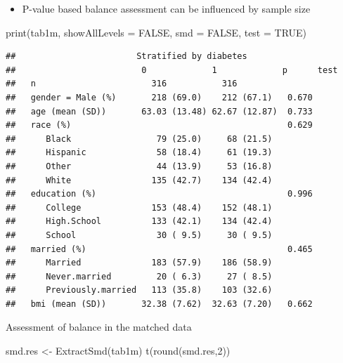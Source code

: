 \documentclass[
]{book}
\newenvironment{Shaded}{\begin{snugshade}}{\end{snugshade}}
\newcommand{\AttributeTok}[1]{\textcolor[rgb]{0.77,0.63,0.00}{#1}}
\newcommand{\ConstantTok}[1]{\textcolor[rgb]{0.00,0.00,0.00}{#1}}
\newcommand{\DecValTok}[1]{\textcolor[rgb]{0.00,0.00,0.81}{#1}}
\newcommand{\FunctionTok}[1]{\textcolor[rgb]{0.00,0.00,0.00}{#1}}
\newcommand{\NormalTok}[1]{#1}
\newcommand{\OtherTok}[1]{\textcolor[rgb]{0.56,0.35,0.01}{#1}}
\providecommand{\tightlist}{%
  \setlength{\itemsep}{0pt}\setlength{\parskip}{0pt}}
\begin{document}
\begin{itemize}
\tightlist
\item
  P-value based balance assessment can be influenced by sample size
\end{itemize}

\begin{Shaded}
\begin{Highlighting}[]
\FunctionTok{print}\NormalTok{(tab1m, }\AttributeTok{showAllLevels =} \ConstantTok{FALSE}\NormalTok{, }\AttributeTok{smd =} \ConstantTok{FALSE}\NormalTok{, }\AttributeTok{test =} \ConstantTok{TRUE}\NormalTok{) }
\end{Highlighting}
\end{Shaded}

\begin{verbatim}
##                        Stratified by diabetes
##                         0             1             p      test
##   n                       316           316                    
##   gender = Male (%)       218 (69.0)    212 (67.1)   0.670     
##   age (mean (SD))       63.03 (13.48) 62.67 (12.87)  0.733     
##   race (%)                                           0.629     
##      Black                 79 (25.0)     68 (21.5)             
##      Hispanic              58 (18.4)     61 (19.3)             
##      Other                 44 (13.9)     53 (16.8)             
##      White                135 (42.7)    134 (42.4)             
##   education (%)                                      0.996     
##      College              153 (48.4)    152 (48.1)             
##      High.School          133 (42.1)    134 (42.4)             
##      School                30 ( 9.5)     30 ( 9.5)             
##   married (%)                                        0.465     
##      Married              183 (57.9)    186 (58.9)             
##      Never.married         20 ( 6.3)     27 ( 8.5)             
##      Previously.married   113 (35.8)    103 (32.6)             
##   bmi (mean (SD))       32.38 (7.62)  32.63 (7.20)   0.662
\end{verbatim}

Assessment of balance in the matched data

\begin{Shaded}
\begin{Highlighting}[]
\NormalTok{smd.res }\OtherTok{\textless{}{-}} \FunctionTok{ExtractSmd}\NormalTok{(tab1m)}
\FunctionTok{t}\NormalTok{(}\FunctionTok{round}\NormalTok{(smd.res,}\DecValTok{2}\NormalTok{))}
\end{Highlighting}
\end{Shaded}
\end{document}
